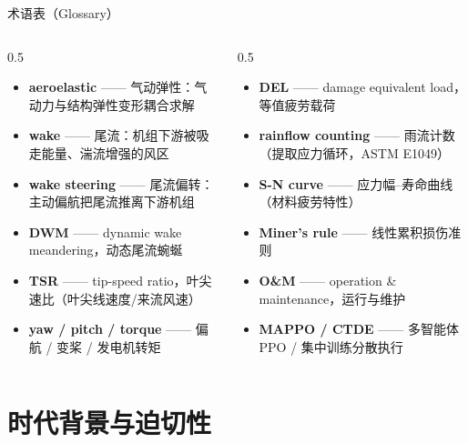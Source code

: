\documentclass[aspectratio=169,10pt,UTF8]{ctexbeamer}
\begin{document}
\begin{frame}{术语表（Glossary）}
  \small
  \begin{columns}[T]
    \begin{column}{0.5\textwidth}
      \begin{itemize}\small
        \item \textbf{aeroelastic} —— 气动弹性：气动力与结构弹性变形耦合求解
        \item \textbf{wake} —— 尾流：机组下游被吸走能量、湍流增强的风区
        \item \textbf{wake steering} —— 尾流偏转：主动偏航把尾流推离下游机组
        \item \textbf{DWM} —— dynamic wake meandering，动态尾流蜿蜒
        \item \textbf{TSR} —— tip-speed ratio，叶尖速比（叶尖线速度/来流风速）
        \item \textbf{yaw / pitch / torque} —— 偏航 / 变桨 / 发电机转矩
      \end{itemize}
    \end{column}
    \begin{column}{0.5\textwidth}
      \begin{itemize}\small
        \item \textbf{DEL} —— damage equivalent load，等值疲劳载荷
        \item \textbf{rainflow counting} —— 雨流计数（提取应力循环，ASTM E1049）
        \item \textbf{S-N curve} —— 应力幅–寿命曲线（材料疲劳特性）
        \item \textbf{Miner's rule} —— 线性累积损伤准则
        \item \textbf{O\&M} —— operation \& maintenance，运行与维护
        \item \textbf{MAPPO / CTDE} —— 多智能体 PPO / 集中训练分散执行
      \end{itemize}
    \end{column}
  \end{columns}
\end{frame}

\section{时代背景与迫切性}
\end{document}
